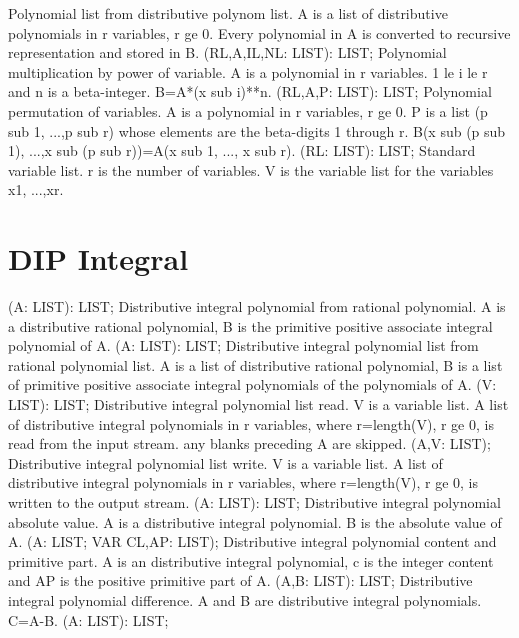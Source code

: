 \bcom Polynomial list from distributive polynom list. A is a list
of distributive polynomials in r variables, r ge 0. Every
polynomial in A is converted to recursive representation and
stored in B.  \ecom 
{} (RL,A,IL,NL: LIST): LIST; \eproc
\bcom Polynomial multiplication by power of variable. A is
a polynomial in r variables. 1 le i le r
and n is a beta-integer. B=A*(x sub i)**n.  \ecom 
{} (RL,A,P: LIST): LIST; \eproc
\bcom Polynomial permutation of variables. A is a polynomial in
r variables, r ge 0. P is a list (p sub 1, ...,p sub r)
whose elements are the beta-digits 1 through r.
B(x sub (p sub 1), ...,x sub (p sub r))=A(x sub 1, ...,
x sub r). \ecom 
{} (RL: LIST): LIST; \eproc
\bcom Standard variable list. r is the number of variables.
V is the variable list for the variables x1, ...,xr.  \ecom 
\section{ DIP Integral  } 
 (A: LIST): LIST; \eproc
\bcom Distributive integral polynomial from rational polynomial.
A is a distributive rational polynomial, B is the primitive
positive associate integral polynomial of A.  \ecom 
{} (A: LIST): LIST; \eproc
\bcom Distributive integral polynomial list from rational polynomial list.
A is a list of distributive rational polynomial, B is a list of primitive
positive associate integral polynomials of the polynomials of A.  \ecom 
{} (V: LIST): LIST; \eproc
\bcom Distributive integral polynomial list read. V is a
variable list. A list of distributive integral polynomials
in r variables, where r=length(V), r ge 0, is read from
the input stream. any blanks preceding A are skipped.  \ecom 
{} (A,V: LIST); \eproc
\bcom Distributive integral polynomial list write. V is a
variable list. A list of distributive integral polynomials
in r variables, where r=length(V), r ge 0, is written to
the output stream.  \ecom 
{} (A: LIST): LIST; \eproc
\bcom Distributive integral polynomial absolute value. A is a
distributive integral polynomial. B is the absolute value of A. \ecom 
{} (A: LIST; VAR CL,AP: LIST); \eproc
\bcom Distributive integral polynomial content and primitive part.
A is an distributive integral polynomial, c is the integer
content and AP is the positive primitive part of A.  \ecom 
{} (A,B: LIST): LIST; \eproc
\bcom Distributive integral polynomial difference. A and B are
distributive integral polynomials. C=A-B. \ecom 
{} (A: LIST): LIST; \eproc
